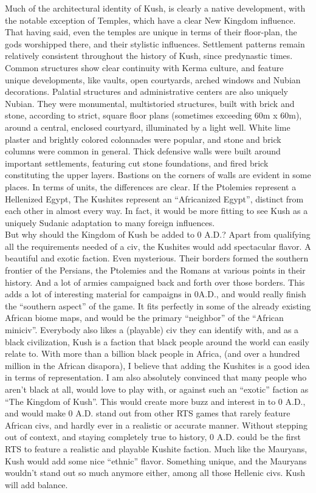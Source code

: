 \documentclass[a4paper,12pt]{scrreprt}
\begin{document}
Much of the architectural identity of Kush, is clearly a native development, with the notable exception of Temples, which have a clear New Kingdom influence. That having said, even the temples are unique in terms of their floor-plan, the gods worshipped there, and their stylistic influences. Settlement patterns remain relatively consistent throughout the history of Kush, since predynastic times. Common structures show clear continuity with Kerma culture, and feature unique developments, like vaults, open courtyards, arched windows and Nubian decorations. Palatial structures and administrative centers are also uniquely Nubian. They were monumental, multistoried structures, built with brick and stone, according to strict, square floor plans (sometimes exceeding 60m x 60m), around a central, enclosed courtyard, illuminated by a light well. White lime plaster and brightly colored colonnades were popular, and stone and brick columns were common in general. Thick defensive walls were built around important settlements, featuring cut stone foundations, and fired brick constituting the upper layers. Bastions on the corners of walls are evident in some places. In terms of units, the differences are clear. If the Ptolemies represent a Hellenized Egypt, The Kushites represent an “Africanized Egypt”, distinct from each other in almost every way. In fact, it would be more fitting to see Kush as a uniquely Sudanic adaptation to many foreign influences.\\ 

But why should the Kingdom of Kush be added to 0 A.D.? Apart from qualifying all the requirements needed of a civ, the Kushites would add spectacular flavor. A beautiful and exotic faction. Even mysterious. Their borders formed the southern frontier of the Persians, the Ptolemies and the Romans at various points in their history. And a lot of armies campaigned back and forth over those borders. This adds a lot of interesting material for campaigns in 0A.D., and would really finish the “southern aspect” of the game. It fits perfectly in some of the already existing African biome maps, and would be the primary “neighbor” of the “African miniciv”. Everybody also likes a (playable) civ they can identify with, and as a black civilization, Kush is a faction that black people around the world can easily relate to. With more than a billion black people in Africa, (and over a hundred million in the African disapora), I believe that adding the Kushites is a good idea in terms of representation. I am also absolutely convinced that many people who aren’t black at all, would love to play with, or against such an “exotic” faction as “The Kingdom of Kush”. This would create more buzz and interest in to 0 A.D., and would make 0 A.D. stand out from other RTS games that rarely feature African civs, and hardly ever in a realistic or accurate manner. Without stepping out of context, and staying completely true to history, 0 A.D. could be the first RTS to feature a realistic and playable Kushite faction. Much like the Mauryans, Kush would add some nice “ethnic” flavor. Something unique, and the Mauryans wouldn’t stand out so much anymore either, among all those Hellenic civs. Kush will add balance.\\
\end{document}
